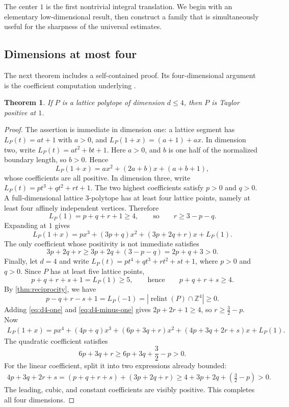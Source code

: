 \documentclass[reqno, 12pt]{article}
\numberwithin{equation}{section}
\newtheorem{theorem}{Theorem}[section]
\theoremstyle{definition}
\newcommand{\Z}{\mathbb{Z}}
\newcommand{\relint}{\operatorname{relint}}
\begin{document}
The center $1$ is the first nontrivial integral translation.  We begin with
an elementary low-dimensional result, then construct a family that is simultaneously useful for the sharpness of the universal estimates.

\subsection{Dimensions at most four}
\label{sec:low-dimensional}

The next theorem includes a self-contained proof.  
Its four-dimensional argument is the coefficient computation underlying \cite[Proposition~4.7]{BeckEtAl2005}.

\begin{theorem}\label{thm:dimension-four}
If $P$ is a lattice polytope of dimension $d\leq4$, then $P$ is Taylor
positive at $1$.
\end{theorem}
\begin{proof}
The assertion is immediate in dimension one: a lattice segment has
$L_P(t)=at+1$ with $a>0$, and $L_P(1+x)=(a+1)+ax$.
In dimension two, write
$L_P(t)=at^2+bt+1$.  Here $a>0$, and $b$ is one half of the
normalized boundary length, so $b>0$.  Hence
\[L_P(1+x)=a x^2+(2a+b)x+(a+b+1),
\]
whose coefficients are all positive.
In dimension three, write $L_P(t)=pt^3+qt^2+rt+1$.
The two highest coefficients satisfy $p>0$ and $q>0$.  A full-dimensional lattice $3$-polytope has at least four lattice points, namely at least four affinely independent vertices.  
Therefore
\[ L_P(1)=p+q+r+1\geq4,\qquad\text{so}\qquad r\geq3-p-q.
\]
Expanding at $1$ gives
\[L_P(1+x)=p x^3+(3p+q)x^2+(3p+2q+r)x+L_P(1).
\]
The only coefficient whose positivity is not immediate satisfies
\[ 3p+2q+r\geq 3p+2q+(3-p-q)=2p+q+3>0.
\]
Finally, let $d=4$ and write $L_P(t)=pt^4+qt^3+rt^2+st+1$, where $p>0$ and $q>0$.  Since $P$ has at least five lattice points,
\begin{equation}\label{eq:d4-one}
p+q+r+s+1=L_P(1)\geq5, \qquad\text{hence}\qquad p+q+r+s\geq4.
\end{equation}
By \eqref{thm:reciprocity}, we have 
\begin{equation}\label{eq:d4-minus-one}
 p-q+r-s+1=L_P(-1)=|\relint(P)\cap\Z^4|\geq0.
\end{equation}
Adding \eqref{eq:d4-one} and \eqref{eq:d4-minus-one} gives $2p+2r+1\geq4$, so $r\geq\frac32-p$.
Now
\begin{align*}
 L_P(1+x)=p x^4+(4p+q)x^3+(6p+3q+r)x^2+(4p+3q+2r+s)x+L_P(1).
\end{align*}
The quadratic coefficient satisfies
\[6p+3q+r \geq 6p+3q+\frac32-p >0.
\]
For the linear coefficient, split it into two expressions already bounded:
\begin{align*}
4p+3q+2r+s=(p+q+r+s)+(3p+2q+r)\geq4+3p+2q+\left(\frac32-p\right)>0.
\end{align*}
The leading, cubic, and constant coefficients are visibly positive.  This completes all four dimensions.
\end{proof}
\end{document}
